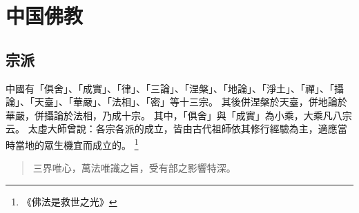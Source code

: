 \section{中国佛教}

\subsection{宗派}
中國有「俱舍」、「成實」、「律」、「三論」、「涅槃」、「地論」、「淨土」、「禪」、「攝論」、「天臺」、「華嚴」、「法相」、「密」等十三宗。
其後併涅槃於天臺，併地論於華嚴，併攝論於法相，乃成十宗。
其中，「俱舍」與「成實」為小乘，大乘凡八宗云。
太虛大師曾說：各宗各派的成立，皆由古代祖師依其修行經驗為主，適應當時當地的眾生機宜而成立的。
\footnote{《佛法是救世之光》}

\begin{quote}
  三界唯心，萬法唯識之旨，受有部之影響特深。
\end{quote}
